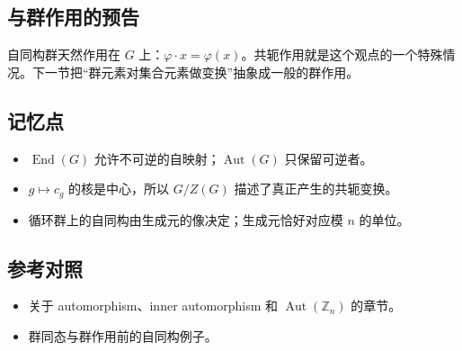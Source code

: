 \subsection{与群作用的预告}


自同构群天然作用在 $G$ 上：$\varphi\cdot x=\varphi(x)$。共轭作用就是这个观点的一个特殊情况。下一节把“群元素对集合元素做变换”抽象成一般的群作用。

\subsection{记忆点}


\begin{itemize}
\item $\operatorname{End}(G)$ 允许不可逆的自映射；$\operatorname{Aut}(G)$ 只保留可逆者。
\item $g\mapsto c_g$ 的核是中心，所以 $G/Z(G)$ 描述了真正产生的共轭变换。
\item 循环群上的自同构由生成元的像决定；生成元恰好对应模 $n$ 的单位。
\end{itemize}


\subsection{参考对照}


\begin{itemize}
\item [DF] 关于 automorphism、inner automorphism 和 $\operatorname{Aut}(\mathbb Z_n)$ 的章节。
\item [DS] 群同态与群作用前的自同构例子。
\end{itemize}
